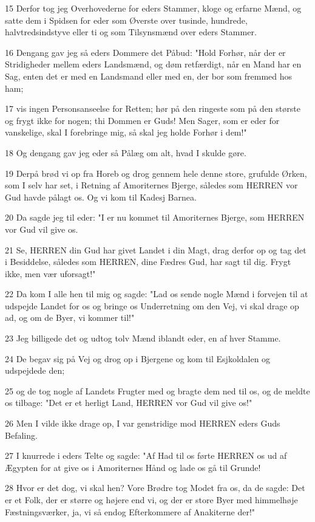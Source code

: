 \par 15 Derfor tog jeg Overhovederne for eders Stammer, kloge og erfarne Mænd, og satte dem i Spidsen for eder som Øverste over tusinde, hundrede, halvtredsindstyve eller ti og som Tilsynsmænd over eders Stammer.
\par 16 Dengang gav jeg så eders Dommere det Påbud: "Hold Forhør, når der er Stridigheder mellem eders Landsmænd, og døm retfærdigt, når en Mand har en Sag, enten det er med en Landsmand eller med en, der bor som fremmed hos ham;
\par 17 vis ingen Personsanseelse for Retten; hør på den ringeste som på den største og frygt ikke for nogen; thi Dommen er Guds! Men Sager, som er eder for vanskelige, skal I forebringe mig, så skal jeg holde Forhør i dem!"
\par 18 Og dengang gav jeg eder så Pålæg om alt, hvad I skulde gøre.
\par 19 Derpå brød vi op fra Horeb og drog gennem hele denne store, grufulde Ørken, som I selv har set, i Retning af Amoriternes Bjerge, således som HERREN vor Gud havde pålagt os. Og vi kom til Kadesj Barnea.
\par 20 Da sagde jeg til eder: "I er nu kommet til Amoriternes Bjerge, som HERREN vor Gud vil give os.
\par 21 Se, HERREN din Gud har givet Landet i din Magt, drag derfor op og tag det i Besiddelse, således som HERREN, dine Fædres Gud, har sagt til dig. Frygt ikke, men vær uforsagt!"
\par 22 Da kom I alle hen til mig og sagde: "Lad os sende nogle Mænd i forvejen til at udspejde Landet for os og bringe os Underretning om den Vej, vi skal drage op ad, og om de Byer, vi kommer til!"
\par 23 Jeg billigede det og udtog tolv Mænd iblandt eder, en af hver Stamme.
\par 24 De begav sig på Vej og drog op i Bjergene og kom til Esjkoldalen og udspejdede den;
\par 25 og de tog nogle af Landets Frugter med og bragte dem ned til os, og de meldte os tilbage: "Det er et herligt Land, HERREN vor Gud vil give os!"
\par 26 Men I vilde ikke drage op, I var genstridige mod HERREN eders Guds Befaling.
\par 27 I knurrede i eders Telte og sagde: "Af Had til os førte HERREN os ud af Ægypten for at give os i Amoriternes Hånd og lade os gå til Grunde!
\par 28 Hvor er det dog, vi skal hen? Vore Brødre tog Modet fra os, da de sagde: Det er et Folk, der er større og højere end vi, og der er store Byer med himmelhøje Fæstningsværker, ja, vi så endog Efterkommere af Anakiterne der!"
